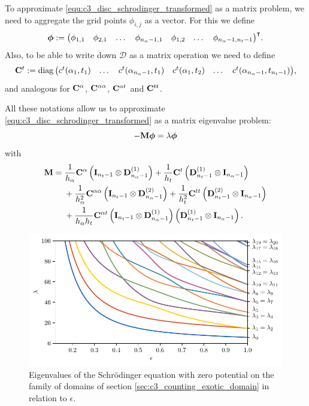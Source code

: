 To approximate \eqref{equ:c3_disc_schrodinger_transformed} as a matrix problem, we need to aggregate the grid points $\phi_{i,j}$ as a vector. For this we define
$$
  \vb*{\phi} := {\begin{pmatrix}
      \phi_{1,1} & \phi_{2,1} & \dots & \phi_{n_\alpha-1, 1} & \phi_{1,2} & \dots & \phi_{n_\alpha-1, n_t-1}
    \end{pmatrix}}^\intercal\text{.}
$$
Also, to be able to write down $\mathcal{D}$ as a matrix operation we need to define
$$
  \vb{C}^{t} := \operatorname{diag}{\begin{pmatrix}
      c^{t}(\alpha_1, t_1) & \dots & c^{t}(\alpha_{n_\alpha-1}, t_1) & c^{t}(\alpha_1, t_2) & \dots & c^{t}(\alpha_{n_\alpha-1}, t_{n_t-1})
    \end{pmatrix}}\text{,}
$$
and analogous for $\vb{C}^{\alpha}$, $\vb{C}^{\alpha\alpha}$, $\vb{C}^{\alpha t}$ and $\vb{C}^{t t}$.

All these notations allow us to approximate \eqref{equ:c3_disc_schrodinger_transformed} as a matrix eigenvalue problem:
$$
  -\vb{M} \vb*{\phi} = \lambda \vb*{\phi}
$$
with
\begin{align*}
  \vb{M} = {} & \frac{1}{h_\alpha} \vb{C}^{\alpha} \left(\vb{I}_{n_t - 1}\otimes \vb{D}^{(1)}_{n_\alpha - 1} \right) + \frac{1}{h_t} \vb{C}^{t} \left(\vb{D}^{(1)}_{n_t - 1}  \otimes \vb{I}_{n_\alpha - 1}\right)                \\
              & {} + \frac{1}{h_\alpha^2} \vb{C}^{\alpha\alpha} \left(\vb{I}_{n_t - 1}\otimes \vb{D}^{(2)}_{n_\alpha - 1}\right) + \frac{1}{h_t^2} \vb{C}^{tt} \left(\vb{D}^{(2)}_{n_t - 1}  \otimes \vb{I}_{n_\alpha - 1}\right) \\
              & {} + \frac{1}{h_\alpha h_t} \vb{C}^{\alpha t} \left(\vb{I}_{n_t - 1}\otimes \vb{D}^{(1)}_{n_\alpha - 1} \right) \left( \vb{D}^{(1)}_{n_t - 1}  \otimes \vb{I}_{n_\alpha - 1} \right)\text{.}
\end{align*}

\begin{figure}
  \begin{center}
    \includegraphics[width=\textwidth]{img/chapter3/on_disc/eigenvalues_flow.pdf}
    \caption{Eigenvalues of the Schrödinger equation with zero potential on the family of domains of section \ref{sec:c3_counting_exotic_domain} in relation to $\epsilon$.}
    \label{fig:c3_disc_eigenvalues_flow}
  \end{center}
\end{figure}

